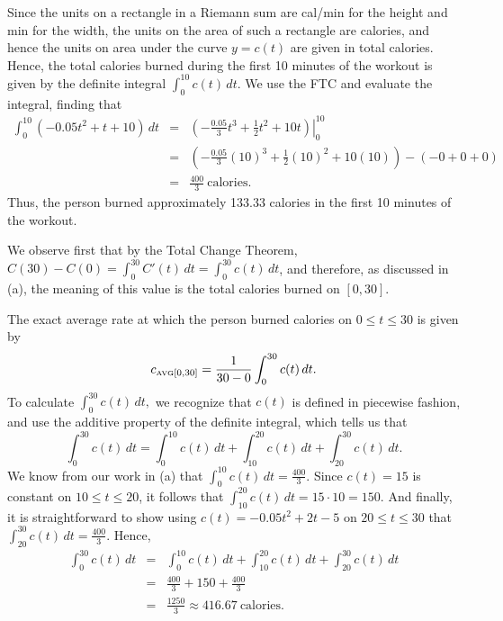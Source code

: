 \begin{activitySolution}
\ba
	\item Since the units on a rectangle in a Riemann sum are cal/min for the height and min for the width, the units on the area of such a rectangle are calories, and hence the units on area under the curve $y = c(t)$ are given in total calories.  Hence, the total calories burned during the first 10 minutes of the workout is given by the definite integral $\int_0^{10} c(t) \, dt$.  We use the FTC and evaluate the integral, finding that
	\begin{eqnarray*}
		\int_0^{10} (-0.05t^2 + t + 10) \, dt & = & \left. \left( -\frac{0.05}{3} t^3 + \frac{1}{2} t^2 + 10t \right) \right|_0^{10} \\
				& = &  \left( -\frac{0.05}{3} (10)^3 + \frac{1}{2} (10)^2 + 10(10) \right) - (-0 + 0 + 0) \\
				& = & \frac{400}{3} \ \mbox{calories}.
	\end{eqnarray*}
	Thus, the person burned approximately 133.33 calories in the first 10 minutes of the workout.
	\item We observe first that by the Total Change Theorem, $C(30) - C(0) = \int_0^{30} C'(t) \, dt = \int_0^{30} c(t) \, dt$, and therefore, as discussed in (a), the meaning of this value is the total calories burned on $[0,30]$.
	\item The exact average rate at which the person burned calories on $0 \le t \le 30$ is given by 
	$$c_{\mbox{\tiny{AVG}}[0,30]} = \frac{1}{30-0} \int_0^{30} c(t) \, dt.$$
	To calculate $\int_0^{30} c(t) \, dt,$ we recognize that $c(t)$ is defined in piecewise fashion, and use the additive property of the definite integral, which tells us that 
	$$\int_0^{30} c(t) \, dt = \int_0^{10} c(t) \, dt +  \int_{10}^{20} c(t) \, dt +  \int_{20}^{30} c(t) \, dt.$$
	We know from our work in (a) that $\int_0^{10} c(t) \, dt = \frac{400}{3}$.  Since $c(t) = 15$ is constant on $10 \le t \le 20$, it follows that $ \int_{10}^{20} c(t) \, dt  = 15 \cdot 10 = 150$.  And finally, it is straightforward to show using $c(t) = -0.05t^2 + 2t - 5$ on $20 \le t \le 30$ that $\int_{20}^{30} c(t) \, dt = \frac{400}{3}$.  Hence,
	\begin{eqnarray*}
	\int_0^{30} c(t) \, dt & = & \int_0^{10} c(t) \, dt +  \int_{10}^{20} c(t) \, dt +  \int_{20}^{30} c(t) \, dt \\
			& = & \frac{400}{3} + 150 + \frac{400}{3} \\
			& = & \frac{1250}{3} \approx 416.67 \ \mbox{calories}.
	\end{eqnarray*}

\end{activitySolution}

